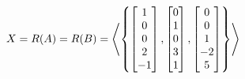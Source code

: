 \documentclass[a4paper,12pt]{article}
\begin{document}
\begin{exm}
  $$X=R(A)=R(B)=\left\langle \left\{ \begin{bmatrix}
    1\\
    0\\
    0\\
    2\\
    -1
  \end{bmatrix},\begin{bmatrix}
    0\\
    1\\
    0\\
    3\\
    1
  \end{bmatrix},\begin{bmatrix}
    0\\
    0\\
    1\\
    -2\\
    5
  \end{bmatrix}\right\}\right\rangle$$
\end{exm}\n
\end{document}
